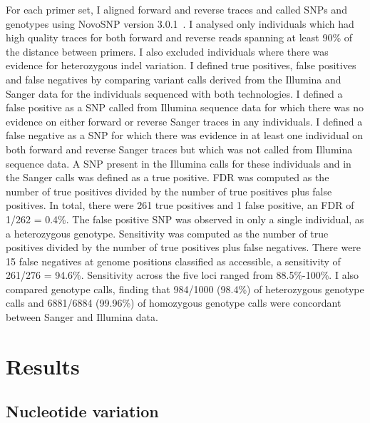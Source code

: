 \begin{refsection}
For each primer set, I aligned forward and reverse traces and called SNPs and genotypes using NovoSNP version 3.0.1~\parencite{Weckx2005}.
%
I analysed only individuals which had high quality traces for both forward and reverse reads spanning at least 90\% of the distance between primers.
%
I also excluded individuals where there was evidence for heterozygous indel variation.
%
I defined true positives, false positives and false negatives by comparing variant calls derived from the Illumina and Sanger data for the individuals sequenced with both technologies.
%
I defined a false positive as a SNP called from Illumina sequence data for which there was no evidence on either forward or reverse Sanger traces in any individuals.
%
I defined a false negative as a SNP for which there was evidence in at least one individual on both forward and reverse Sanger traces but which was not called from Illumina sequence data.
%
A SNP present in the Illumina calls for these individuals and in the Sanger calls was defined as a true positive.
%
FDR was computed as the number of true positives divided by the number of true positives plus false positives.
%
In total, there were 261 true positives and 1 false positive, an FDR of 1/262 = 0.4\%.
%
The false positive SNP was observed in only a single individual, as a heterozygous genotype.
%
Sensitivity was computed as the number of true positives divided by the number of true positives plus false negatives.
%
There were 15 false negatives at genome positions classified as accessible, a sensitivity of 261/276 = 94.6\%.
%
Sensitivity across the five loci ranged from 88.5\%-100\%.
%
I also compared genotype calls, finding that 984/1000 (98.4\%) of heterozygous genotype calls and 6881/6884 (99.96\%) of homozygous genotype calls were concordant between Sanger and Illumina data.


\section{Results}\label{sec:ch3-results}


\subsection{Nucleotide variation}\label{subsec:nucleotide-variation}



\end{refsection}
